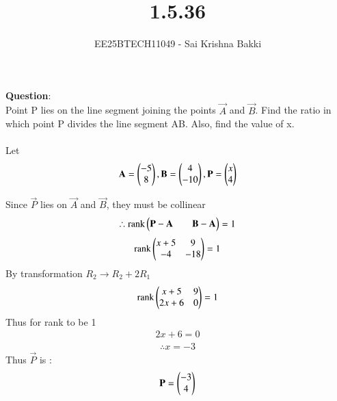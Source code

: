 \documentclass[journal]{IEEEtran}
\begin{document}

\vspace{3cm}

\title{1.5.36}
\author{EE25BTECH11049 - Sai Krishna Bakki}
 \maketitle
{\let\newpage\relax\maketitle}

\renewcommand{\thefigure}{\theenumi}
\renewcommand{\thetable}{\theenumi}
\setlength{\intextsep}{10pt} %


\renewcommand{\thetable}{\theenumi}

\textbf{Question}:\\
Point P lies on the line segment joining the points $\vec{A}$ and $\vec{B}$. Find the ratio in which point P divides the line segment AB. Also, find the value of x. \\ 
\solution \\
Let 
\begin{align*}
\mathbf{A}= \begin{pmatrix}-5 \\ 8\end{pmatrix}, \mathbf{B}= \begin{pmatrix}4 \\ -10\end{pmatrix} , \mathbf{P} = \begin{pmatrix}x \\ 4\end{pmatrix}
\end{align*}    

Since $\vec{P}$ lies on $\vec{A}$ and $\vec{B}$, they must be collinear
\begin{align*}
\therefore \text{rank}\begin{pmatrix}\mathbf{P} - \mathbf{A} & &\mathbf{B} - \mathbf{A}\end{pmatrix} = 1
\end{align*}
\begin{align*}
    \text{rank}\begin{pmatrix}x+5 & 9 \\ -4 & -18\end{pmatrix} = 1
\end{align*}
By transformation $R_2 \rightarrow R_2 + 2R_1$
\begin{align*}
    \text{rank}\begin{pmatrix}x+5 & 9 \\ 2x+6 & 0\end{pmatrix} = 1
\end{align*}
Thus for rank to be 1
\begin{align*}
    2x+6 = 0
\end{align*}
\begin{align*}
\therefore x = -3
\end{align*}
Thus $\vec{P}$ is :
\begin{align*}
    \mathbf{P} = \begin{pmatrix}-3 \\ 4\end{pmatrix}
\end{align*}
\end{document}

